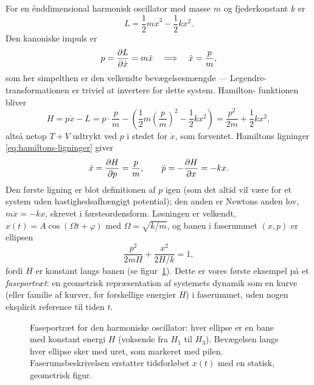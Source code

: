\begin{eksempel}
For en énddimensional harmonisk oscillator med masse $m$ og
fjederkonstant $k$ er
\begin{equation}
  L = \frac12 m\dot x^2 - \frac12 kx^2.
\end{equation}
Den kanoniske impuls er
\begin{equation}
  p = \pdv{L}{\dot x} = m\dot x
  \quad\Longrightarrow\quad
  \dot x = \frac{p}{m},
\end{equation}
som her simpelthen er den velkendte bevægelsesmængde — Legendre-
transformationen er triviel at invertere for dette system. Hamilton-
funktionen bliver
\begin{equation}
  H = p\dot x - L = p\cdot\frac{p}{m} - \left(\frac12 m\left(\frac{p}{m}\right)^2 - \frac12 kx^2\right)
    = \frac{p^2}{2m} + \frac12 kx^2,
\end{equation}
altså netop $T+V$ udtrykt ved $p$ i stedet for $\dot x$, som forventet.
Hamiltons ligninger \eqref{eq:hamiltons-ligninger} giver
\begin{equation}
  \dot x = \pdv{H}{p} = \frac{p}{m}, \qquad
  \dot p = -\pdv{H}{x} = -kx.
\end{equation}
Den første ligning er blot definitionen af $p$ igen (som det altid vil
være for et system uden hastighedsafhængigt potential); den anden er
Newtons anden lov, $m\ddot x=-kx$, skrevet i førsteordensform. Løsningen
er velkendt, $x(t)=A\cos(\Omega t+\varphi)$ med $\Omega=\sqrt{k/m}$, og
banen i faserummet $(x,p)$ er ellipsen
\begin{equation}
  \frac{p^2}{2mH} + \frac{x^2}{2H/k} = 1,
\end{equation}
fordi $H$ er konstant langs banen (se figur~\ref{fig:faseportraet}).
Dette er vores første eksempel på et \emph{faseportræt}: en geometrisk
repræsentation af systemets dynamik som en kurve (eller familie af
kurver, for forskellige energier $H$) i faserummet, uden nogen
eksplicit reference til tiden $t$.
\end{eksempel}

\begin{figure}[htbp]
  \centering
  \caption{Faseportræt for den harmoniske oscillator: hver ellipse er en
  bane med konstant energi $H$ (voksende fra $H_1$ til $H_3$).
  Bevægelsen langs hver ellipse sker med uret, som markeret med pilen.
  Faserumsbeskrivelsen erstatter tidsforløbet $x(t)$ med en statisk,
  geometrisk figur.}
  \label{fig:faseportraet}
\end{figure}

